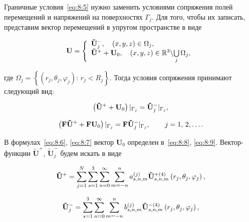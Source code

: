Граничные условия~\eqref{eq:8:5} нужно заменить условиями сопряжения полей перемещений и напряжений на поверхностях $\Gamma_j$. Для того, чтобы их записать, представим вектор перемещений в упругом пространстве в виде

\begin{equation}
{\bf{U}} = \left\{ {\begin{array}{*{20}{l}}
{{\bf{\tilde U}}_j^ - ,\quad \left( {x,y,z} \right) \in {\Omega _j},}\\
{{{{\bf{\tilde U}}}^ + } + {{\bf{U}}_0},\quad \left( {x,y,z} \right) \in\mathbb{R}{^3}\backslash {\bigcup\limits_j\Omega _j},}
\end{array}} \right.
\label{eq:8:6}
\end{equation}

\noindent где ${\Omega _j} = \left\{ {\left( {{r_j},{\theta _j},{\varphi _j}} \right):\, {r_j} < {R_j}} \right\}$. Тогда условия сопряжения принимают следующий вид:

\begin{equation}
\left( {{{{\bf{\tilde U}}}^ + } + {{\bf{U}}_0}} \right){|_{{\Gamma _j}}} = {\bf{\tilde U}}_j^ - {|_{{\Gamma _j}}},
\label{eq:8:7}
\end{equation}

\begin{equation}
\left( {{\bf{F\tilde U^+}} + {\bf{F}}{{\bf{U}}_0}} \right){|_{{\Gamma _j}}} = {\bf{F}}{{\bf{\tilde U^-}}_j}{|_{{\Gamma _j}}},\qquad {\kern 1pt} j = 1,{\mkern 1mu} {\kern 1pt} 2,\dots.
\label{eq:8:11}
\end{equation}

В формулах~\eqref{eq:8:6}, \eqref{eq:8:7} вектор $\mathbf{U}_0$ определен в~\eqref{eq:8:8}, \eqref{eq:8:9}. Вектор-функции $\mathbf{\tilde U}^+$, $\mathbf{\tilde U}_j^-$ будем искать в виде

\begin{equation}
{{\bf{\tilde U}}^ + } = \mathop \sum \limits_{j = 1}^N \sum\limits_{s = 1}^3 {\sum\limits_{n = 0}^\infty  {\sum\limits_{m =  - n }^{n} {a_{s,n,m}^{(j)}} } } {\bf{\tilde U}}_{s,n,m}^{ + (4)}\left( {{r_j},{\theta _j},{\varphi _j}} \right),
\end{equation}

\begin{equation}
{\bf{\tilde U}}_j^ -  = \sum\limits_{s = 1}^3 {\sum\limits_{n = 0}^\infty  {\sum\limits_{m =  - n}^{n} {b_{s,n,m}^{(j)}} } } {\bf{\tilde U}}_{s,n,m}^{ - (4)}\left( {{r_j},{\theta _j},{\varphi _j}} \right),
\end{equation}

